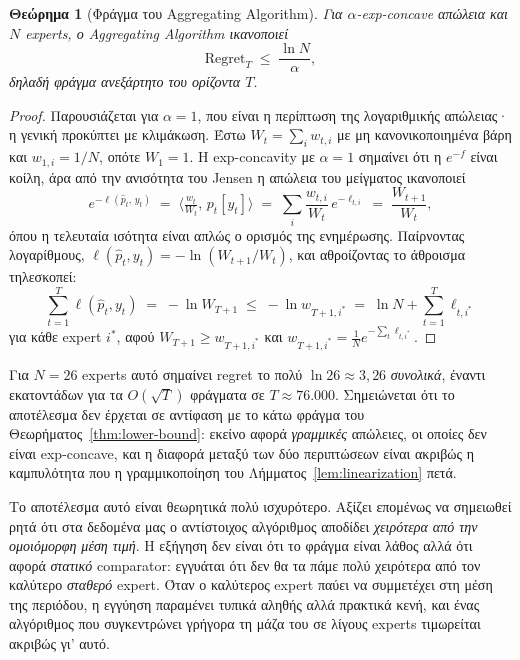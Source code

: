 \documentclass[12pt,a4paper,oneside]{report}
\renewcommand{\_}{\oldunderscore\allowbreak}
\theoremstyle{definition}
\theoremstyle{plain}
\newtheorem{theorem}{Θεώρημα}[chapter]
\theoremstyle{remark}
\begin{document}
\begin{theorem}[Φράγμα του Aggregating Algorithm]
\label{thm:aa}
Για $\alpha$-exp-concave απώλεια και $N$ experts, ο Aggregating Algorithm ικανοποιεί
\[
\mathrm{Regret}_T \;\leq\; \frac{\ln N}{\alpha},
\]
δηλαδή φράγμα \emph{ανεξάρτητο του ορίζοντα} $T$.
\end{theorem}

\begin{proof}
Παρουσιάζεται για $\alpha=1$, που είναι η περίπτωση της λογαριθμικής απώλειας· η γενική
προκύπτει με κλιμάκωση. Έστω $W_t = \sum_i w_{t,i}$ με μη κανονικοποιημένα βάρη και
$w_{1,i}=1/N$, οπότε $W_1=1$. Η exp-concavity με $\alpha=1$ σημαίνει ότι η $e^{-f}$ είναι
κοίλη, άρα από την ανισότητα του Jensen η απώλεια του μείγματος ικανοποιεί
\[
e^{-\ell(\hat{p}_t,\,y_t)} \;=\; \Big\langle \tfrac{w_t}{W_t},\, p_t[y_t]\Big\rangle
\;=\; \sum_i \frac{w_{t,i}}{W_t}\, e^{-\ell_{t,i}} \;=\; \frac{W_{t+1}}{W_t},
\]
όπου η τελευταία ισότητα είναι απλώς ο ορισμός της ενημέρωσης. Παίρνοντας λογαρίθμους,
$\ell(\hat{p}_t,y_t) = -\ln(W_{t+1}/W_t)$, και αθροίζοντας το άθροισμα τηλεσκοπεί:
\[
\sum_{t=1}^{T} \ell(\hat{p}_t, y_t) \;=\; -\ln W_{T+1} \;\leq\; -\ln w_{T+1,i^{*}}
\;=\; \ln N + \sum_{t=1}^{T} \ell_{t,i^{*}}
\]
για κάθε expert $i^{*}$, αφού $W_{T+1} \geq w_{T+1,i^{*}}$ και
$w_{T+1,i^{*}} = \frac{1}{N}e^{-\sum_t \ell_{t,i^{*}}}$.
\end{proof}

Για $N=26$ experts αυτό σημαίνει regret το πολύ $\ln 26 \approx 3{,}26$ \emph{συνολικά},
έναντι εκατοντάδων για τα $O(\sqrt{T})$ φράγματα σε $T\approx 76.000$. Σημειώνεται ότι το
αποτέλεσμα δεν έρχεται σε αντίφαση με το κάτω φράγμα του Θεωρήματος~\ref{thm:lower-bound}:
εκείνο αφορά \emph{γραμμικές} απώλειες, οι οποίες δεν είναι exp-concave, και η διαφορά μεταξύ
των δύο περιπτώσεων είναι ακριβώς η καμπυλότητα που η γραμμικοποίηση του
Λήμματος~\ref{lem:linearization} πετά.

Το αποτέλεσμα αυτό είναι θεωρητικά πολύ ισχυρότερο. Αξίζει επομένως να σημειωθεί ρητά ότι
στα δεδομένα μας ο αντίστοιχος αλγόριθμος αποδίδει \emph{χειρότερα από την ομοιόμορφη μέση
τιμή}. Η εξήγηση δεν είναι ότι το φράγμα είναι λάθος αλλά ότι αφορά \emph{στατικό}
comparator: εγγυάται ότι δεν θα τα πάμε πολύ χειρότερα από τον καλύτερο \emph{σταθερό}
expert. Όταν ο καλύτερος expert παύει να συμμετέχει στη μέση της περιόδου, η εγγύηση
παραμένει τυπικά αληθής αλλά πρακτικά κενή, και ένας αλγόριθμος που συγκεντρώνει γρήγορα τη
μάζα του σε λίγους experts τιμωρείται ακριβώς γι' αυτό.
\end{document}
